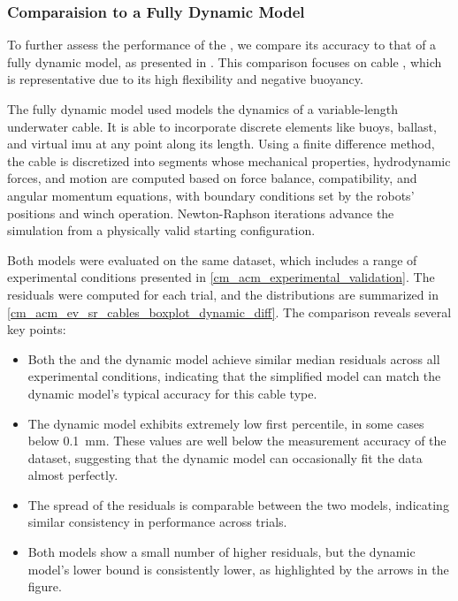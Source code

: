 \subsubsection{Comparaision to a Fully Dynamic Model}
\label{cm_acm_ev_comparaision_to_a_fully_dynamic_model}

To further assess the performance of the \thetagammamodel{}, we compare its accuracy to that of a
fully dynamic model, as presented in \cite{peraudIMUbasedMonitoringBuoyBallast2024}. This
comparison focuses on cable , which is representative due to its high
flexibility and negative buoyancy.

The fully dynamic model used models the dynamics of a variable-length underwater cable. It is able
to incorporate discrete elements like buoys, ballast, and virtual \ac{imu} at any point along its
length. Using a finite difference method, the cable is discretized into segments whose mechanical
properties, hydrodynamic forces, and motion are computed based on force balance, compatibility, and
angular momentum equations, with boundary conditions set by the robots' positions and winch
operation. Newton-Raphson iterations advance the simulation from a physically valid starting
configuration.

Both models were evaluated on the same dataset, which includes a range of experimental conditions
presented in \cref{cm_acm_experimental_validation}. The residuals were computed for each trial, and
the distributions are summarized in \cref{cm_acm_ev_sr_cables_boxplot_dynamic_diff}. The comparison
reveals several key points:
\begin{itemize}
	\item Both the \thetagammamodel{} and the dynamic model achieve similar median residuals across all
	      experimental conditions, indicating that the simplified model can match the dynamic model's typical
	      accuracy for this cable type.
	\item The dynamic model exhibits extremely low first percentile, in some cases below
	      \qty{0.1}{\milli\meter}. These values are well below the measurement accuracy of the dataset,
	      suggesting that the dynamic model can occasionally fit the data almost perfectly.
	\item The spread of the residuals is comparable between the two models, indicating similar consistency in
	      performance across trials.
	\item Both models show a small number of higher residuals, but the dynamic model's lower bound is
	      consistently lower, as highlighted by the arrows in the figure.
\end{itemize}

